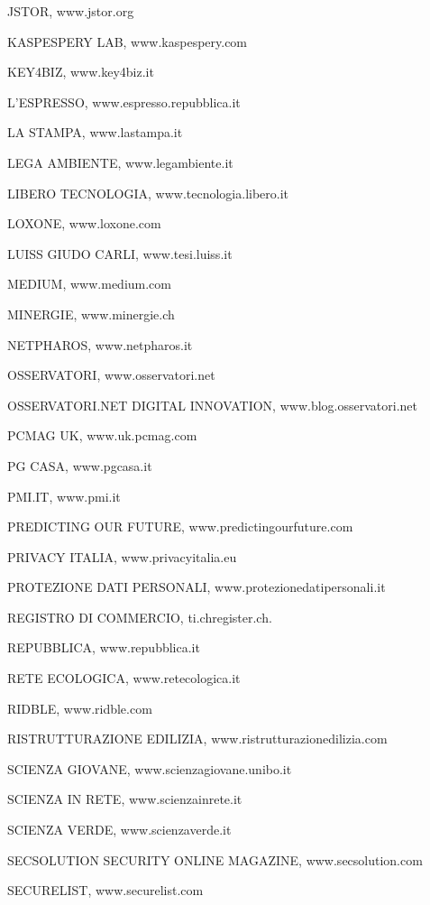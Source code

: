 \noindent JSTOR, www.jstor.org 

\noindent KASPESPERY LAB, www.kaspespery.com 

\noindent KEY4BIZ, www.key4biz.it 

\noindent L'ESPRESSO, www.espresso.repubblica.it  

\noindent LA STAMPA, www.lastampa.it

\noindent LEGA AMBIENTE, www.legambiente.it

\noindent LIBERO TECNOLOGIA, www.tecnologia.libero.it 

\noindent LOXONE, www.loxone.com

\noindent LUISS GIUDO CARLI, www.tesi.luiss.it

\noindent MEDIUM, www.medium.com 

\noindent MINERGIE, www.minergie.ch

\noindent NETPHAROS, www.netpharos.it 

\noindent OSSERVATORI, www.osservatori.net

\noindent OSSERVATORI.NET DIGITAL INNOVATION, www.blog.osservatori.net

\noindent PCMAG UK, www.uk.pcmag.com 

\noindent PG CASA, www.pgcasa.it

\noindent PMI.IT, www.pmi.it 

\noindent PREDICTING OUR FUTURE, www.predictingourfuture.com 

\noindent PRIVACY ITALIA, www.privacyitalia.eu 

\noindent PROTEZIONE DATI PERSONALI, www.protezionedatipersonali.it  

\noindent REGISTRO DI COMMERCIO, ti.chregister.ch.

\noindent REPUBBLICA, www.repubblica.it

\noindent RETE ECOLOGICA, www.retecologica.it

\noindent RIDBLE, www.ridble.com 

\noindent RISTRUTTURAZIONE EDILIZIA, www.ristrutturazionedilizia.com

\noindent SCIENZA GIOVANE, www.scienzagiovane.unibo.it

\noindent SCIENZA IN RETE, www.scienzainrete.it

\noindent SCIENZA VERDE, www.scienzaverde.it

\noindent SECSOLUTION SECURITY ONLINE MAGAZINE, www.secsolution.com 

\noindent SECURELIST, www.securelist.com 

